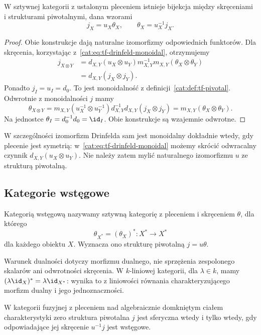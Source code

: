 \begin{twierdzenie}\label{cat:thm:tf-twist-pivotal}
W sztywnej kategorii z ustalonym pleceniem istnieje bijekcja między skręceniami i strukturami piwotalnymi, dana wzorami
\[
 j_X=u_X\theta_X,\qquad \theta_X=u_X^{-1}j_X.
\]
\end{twierdzenie}
\begin{proof}
Obie konstrukcje dają naturalne izomorfizmy odpowiednich funktorów. Dla skręcenia, korzystając z~\eqref{cat:eq:tf-drinfeld-monoidal}, otrzymujemy
\[
\begin{aligned}
 j_{X\otimes Y}
 &=d_{X,Y}(u_X\otimes u_Y)m_{X,Y}^{-1}
 m_{X,Y}(\theta_X\otimes\theta_Y)\\
 &=d_{X,Y}(j_X\otimes j_Y).
\end{aligned}
\]
Ponadto $j_I=u_I=d_0$. To jest monoidalność z definicji~\ref{cat:def:tf-pivotal}. Odwrotnie z monoidalności $j$ mamy
\[
 \theta_{X\otimes Y}
 =m_{X,Y}(u_X^{-1}\otimes u_Y^{-1})
 d_{X,Y}^{-1}d_{X,Y}(j_X\otimes j_Y)
 =m_{X,Y}(\theta_X\otimes\theta_Y).
\]
Na jednostce $\theta_I=d_0^{-1}d_0=\id_I$. Obie konstrukcje są wzajemnie odwrotne.
\end{proof}

W szczególności izomorfizm Drinfelda sam jest monoidalny dokładnie wtedy, gdy plecenie jest symetrią: w~\eqref{cat:eq:tf-drinfeld-monoidal} możemy skrócić odwracalny czynnik $d_{X,Y}(u_X\otimes u_Y)$. Nie należy zatem mylić naturalnego izomorfizmu $u$ ze strukturą piwotalną.

\subsection{Kategorie wstęgowe}

\begin{definicja}\label{cat:def:tf-ribbon}
Kategorią wstęgową nazywamy sztywną kategorię z pleceniem i skręceniem $\theta$, dla którego
\[
 \theta_{X^*}=(\theta_X)^*:X^*\to X^*
\]
dla każdego obiektu $X$. Wyznacza ono strukturę piwotalną $j=u\theta$.
\end{definicja}

Warunek dualności dotyczy morfizmu dualnego, nie sprzężenia zespolonego skalarów ani odwrotności skręcenia. W $k$-liniowej kategorii, dla $\lambda\in k$, mamy $(\lambda\id_X)^*=\lambda\id_{X^*}$: wynika to z liniowości równania charakteryzującego morfizm dualny i jego jednoznaczności.

\begin{twierdzenie}\label{cat:thm:tf-ribbon-spherical}
W kategorii fuzyjnej z pleceniem nad algebraicznie domkniętym ciałem charakterystyki zero struktura piwotalna $j$ jest sferyczna wtedy i tylko wtedy, gdy odpowiadające jej skręcenie $u^{-1}j$ jest wstęgowe.
\end{twierdzenie}

